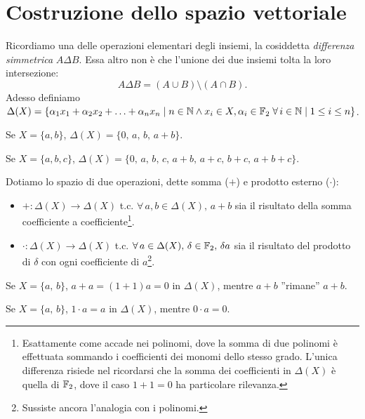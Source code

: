 \documentclass[a4paper]{article}
\begin{document}
\section{Costruzione dello spazio vettoriale}

Ricordiamo una delle operazioni elementari degli insiemi, la cosiddetta \textit{differenza
simmetrica} $A \Delta B$. Essa altro non è che l'unione dei due insiemi tolta la loro
intersezione: \[A \Delta B = \left( A \cup B \right) \setminus \left( A \cap B \right).\]
Adesso definiamo $\Delta (X) = \{ \alpha_1 x_1 + \alpha_2 x_2 + \ldots + \alpha_n x_n \mid n \in \mathbb{N} \land x_i \in X, \alpha_i \in \mathbb{F}_2 \; \forall \, i \in \mathbb{N} \mid  1 \leq i \leq n \}$.

\begin{example}
Se $X = \{a, b\}$, $\Delta (X) = \{0, \, a, \, b, \, a+b\}$.
\end{example}
\begin{example}
Se $X = \{a, b, c\}$, $\Delta (X) = \{0, \, a, \, b, \, c, \, a+b, \, a+c, \, b+c, \, a+b+c\}$.
\end{example}

Dotiamo lo spazio di due operazioni, dette somma ($+$) e prodotto esterno ($\cdot$):

\begin{itemize}
    \item $+ : \Delta (X) \to \Delta (X)$ t.c. $\forall \, a, b \in \Delta (X), \, a+b$ sia il risultato della
    somma coefficiente a coefficiente\footnote{Esattamente come accade nei polinomi, dove
    la somma di due polinomi è effettuata sommando i coefficienti dei monomi dello stesso
    grado. L'unica differenza risiede nel ricordarsi che la somma dei coefficienti in $\Delta (X)$ è quella di $\mathbb{F}_2$, dove il caso $1+1=0$ ha particolare rilevanza.}.
    \item $\cdot : \Delta (X) \to \Delta (X)$ t.c. $\forall \, a \in \Delta (X), \, \delta \in \mathbb{F}_2, \, \delta a$ sia il risultato del prodotto di $\delta$ con ogni coefficiente di $a$\footnote{Sussiste ancora l'analogia con i polinomi.}.
\end{itemize}

\begin{example}
Se $X = \{a, \, b\}$, $a+a=(1+1)a=0$ in $\Delta (X)$, mentre $a+b$ ''rimane'' $a+b$.
\end{example}

\begin{example}
Se $X = \{a, \, b\}$, $1\cdot a=a$ in $\Delta (X)$, mentre $0 \cdot a = 0$.
\end{example}
\end{document}
